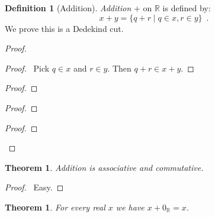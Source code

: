 \documentclass{article}
\let\qed\relax
\newtheorem{theorem}[axiom]{Theorem}
\theoremstyle{definition}
\newtheorem{definition}[axiom]{Definition}
\begin{document}
    \begin{definition}[Addition]
        \emph{Addition} $+$ on $\mathbb{R}$ is defined by:
        \[ x + y = \{ q + r \mid q \in x, r \in y \} \enspace .\]
        We prove this is a Dedekind cut.
    \end{definition}

    \begin{proof}
        \pf
        \begin{proof}
            \pf\ Pick $q \in x$ and $r \in y$. Then $q + r \in x + y$.
        \end{proof}
        \begin{proof}
        \end{proof}
        \begin{proof}
        \end{proof}
        \begin{proof}
        \end{proof}
        \qed
    \end{proof}

    \begin{theorem}
        Addition is associative and commutative.
    \end{theorem}

    \begin{proof}
        \pf\ Easy. \qed
    \end{proof}

    \begin{theorem}
        For every real $x$ we have $x + 0_\mathbb{R} = x$.
    \end{theorem}
\end{document}
